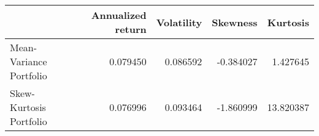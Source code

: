 \begin{tabular}{lrrrr}
\toprule
{} &  Annualized return &  Volatility &  Skewness &   Kurtosis \\
\midrule
Mean-Variance Portfolio &           0.079450 &    0.086592 & -0.384027 &   1.427645 \\
Skew-Kurtosis Portfolio &           0.076996 &    0.093464 & -1.860999 &  13.820387 \\
\bottomrule
\end{tabular}
